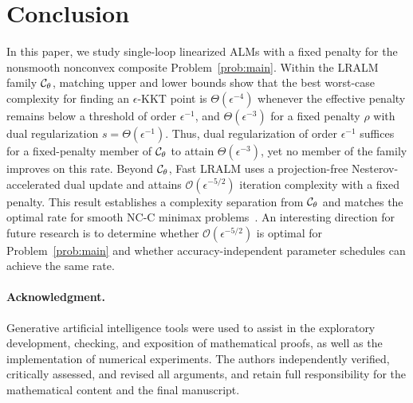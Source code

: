 \section{Conclusion}
\label{sec:conclusion}
In this paper, we study single-loop linearized ALMs with a fixed penalty for
the nonsmooth nonconvex composite Problem~\eqref{prob:main}. Within the LRALM
family \(\mathcal{C}_\theta\), matching upper and lower bounds show that the best
worst-case complexity for finding an \(\epsilon\)-KKT point is
\(\Theta(\epsilon^{-4})\) whenever the effective penalty remains below a
threshold of order \(\epsilon^{-1}\), and \(\Theta(\epsilon^{-3})\) for a fixed
penalty \(\rho\) with dual regularization \(s=\Theta(\epsilon^{-1})\). Thus,
dual regularization of order \(\epsilon^{-1}\) suffices for a fixed-penalty
member of \(\mathcal{C}_\theta\) to attain \(\Theta(\epsilon^{-3})\), yet no member of
the family improves on this rate. Beyond \(\mathcal{C}_\theta\), Fast LRALM uses a
projection-free Nesterov-accelerated dual update and attains
\(\mathcal O(\epsilon^{-5/2})\) iteration complexity with a fixed penalty. This
result establishes a complexity separation from \(\mathcal{C}_\theta\) and matches the
optimal rate for smooth NC-C minimax problems~\cite{pan2026optimal}. An
interesting direction for future research is to determine whether
\(\mathcal O(\epsilon^{-5/2})\) is optimal for Problem~\eqref{prob:main} and
whether accuracy-independent parameter schedules can achieve the same rate.

\paragraph{Acknowledgment.}
Generative artificial intelligence tools were used to assist in the
exploratory development, checking, and exposition of mathematical proofs, as
well as the implementation of numerical experiments. The authors independently
verified, critically assessed, and revised all arguments, and retain full
responsibility for the mathematical content and the final manuscript.

\setcounter{topnumber}{1}\setcounter{totalnumber}{1}
 